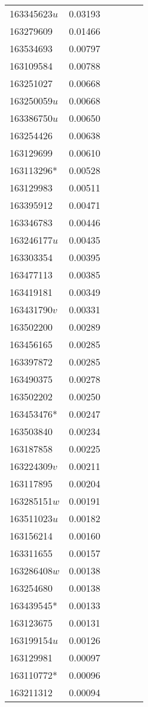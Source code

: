 \begin{landscape}
\begin{longtable}{p{1.6cm}p{1.2cm}p{1.5cm}p{1.5cm}p{2.8cm}p{13.5cm}}
163345623$u$&0.03193&&&& \\
163279609&0.01466&&&& \\
163534693&0.00797&&&& \\
163109584&0.00788&&&& \\
163251027&0.00668&&&& \\
163250059$u$&0.00668&&&& \\
163386750$u$&0.00650&&&& \\
163254426&0.00638&&&& \\
163129699&0.00610&&&& \\
163113296*&0.00528&&&& \\
163129983&0.00511&&&& \\
163395912&0.00471&&&& \\
163346783&0.00446&&&& \\
163246177$u$&0.00435&&&& \\
163303354&0.00395&&&& \\
163477113&0.00385&&&& \\
163419181&0.00349&&&& \\
163431790$v$&0.00331&&&& \\
163502200&0.00289&&&& \\
163456165&0.00285&&&& \\
163397872&0.00285&&&& \\
163490375&0.00278&&&& \\
163502202&0.00250&&&& \\
163453476*&0.00247&&&& \\
163503840&0.00234&&&& \\
163187858&0.00225&&&& \\
163224309$v$&0.00211&&&& \\
163117895&0.00204&&&& \\
163285151$w$&0.00191&&&& \\
163511023$u$&0.00182&&&& \\
163156214&0.00160&&&& \\
163311655&0.00157&&&& \\
163286408$w$&0.00138&&&& \\
163254680&0.00138&&&& \\
163439545*&0.00133&&&& \\
163123675&0.00131&&&& \\
163199154$u$&0.00126&&&& \\
163129981&0.00097&&&& \\
163110772*&0.00096&&&& \\
163211312&0.00094&&&& \\

\end{longtable}
\end{landscape}

